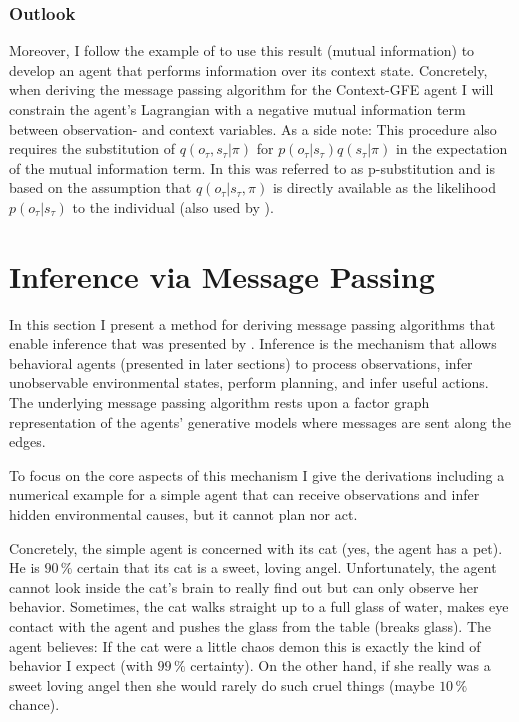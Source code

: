 \subsubsection{Outlook}

Moreover, I follow the example of \textcite{delaar2023,delaar2025} to use this result (mutual information) to develop an agent that performs information over its context state. Concretely, when deriving the message passing algorithm for the Context-GFE agent I will constrain the agent's Lagrangian with a negative mutual information term between observation- and context variables. As a side note: This procedure also requires the substitution of \(q(o_{\tau},s_{\tau}|\pi)\) for \(p(o_{\tau}|s_{\tau}) q(s_{\tau}|\pi)\) in the expectation of the mutual information term. In \cite{delaar2023,delaar2025} this was referred to as p-substitution and is based on the assumption that \(q(o_{\tau}|s_{\tau},\pi)\) is directly available as the likelihood \(p(o_{\tau}|s_{\tau})\) to the individual (also used by \textcite{friston2015}).


\section{Inference via Message Passing}
\label{sec:1}

In this section I present a method for deriving message passing algorithms that enable inference that was presented by \textcite{senoez2021,delaar2023,delaar2025}. Inference is the mechanism that allows behavioral agents (presented in later sections) to process observations, infer unobservable environmental states, perform planning, and infer useful actions. The underlying message passing algorithm rests upon a factor graph representation of the agents' generative models where messages are sent along the edges.

To focus on the core aspects of this mechanism I give the derivations including a numerical example for a simple agent that can receive observations and infer hidden environmental causes, but it cannot plan nor act.

Concretely, the simple agent is concerned with its cat (yes, the agent has a pet). He is \(90\,\%\) certain that its cat is a sweet, loving angel. Unfortunately, the agent cannot look inside the cat's brain to really find out but can only observe her behavior. Sometimes, the cat walks straight up to a full glass of water, makes eye contact with the agent and pushes the glass from the table (breaks glass). The agent believes: If the cat were a little chaos demon this is exactly the kind of behavior I expect (with \(99\,\%\) certainty). On the other hand, if she really was a sweet loving angel then she would rarely do such cruel things (maybe \(10\,\%\) chance).

